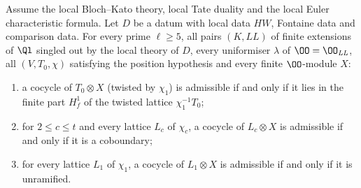 \begin{theorem}\label{pf:linkN-sel:top}
Assume the local Bloch--Kato theory, local Tate duality and the local Euler characteristic formula. Let $D$ be a datum with local data $HW$,
Fontaine data and comparison data. For every prime $\ell\ge5$, all pairs $(K,\mathit{LL})$ of finite extensions of $\Ql$ singled out by the
local theory of $D$, every uniformiser $\lambda$ of $\OO=\OO_{\mathit{LL}}$, all $(V,T_0,\chi)$ satisfying the position hypothesis and every
finite $\OO$-module $X$:
\begin{enumerate}[label=(\roman*)]
\item a cocycle of $T_0\otimes X$ (twisted by $\chi_1$) is admissible if and only if it lies in the finite part $H^1_f$ of the twisted lattice
$\chi_1^{-1}T_0$;
\item for $2\le c\le t$ and every lattice $L_c$ of $\chi_c$, a cocycle of $L_c\otimes X$ is admissible if and only if it is a coboundary;
\item for every lattice $L_1$ of $\chi_1$, a cocycle of $L_1\otimes X$ is admissible if and only if it is unramified.
\end{enumerate}
\end{theorem}

